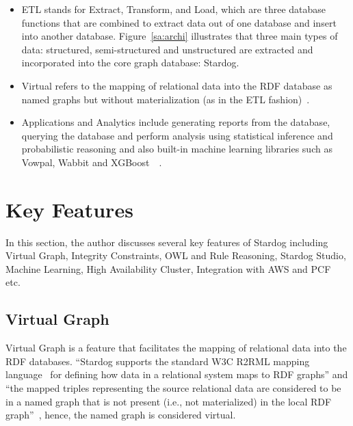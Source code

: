	\begin{itemize}
		
		\item ETL stands for Extract, Transform, and Load, which are three 
		database functions that are combined to extract data out of one 
		database and insert into another database. Figure~\ref{sa:archi} 
		illustrates that three main types of data: structured, semi-structured 
		and unstructured are extracted and incorporated into the core graph 
		database: Stardog. 
		
		\item Virtual refers to the mapping of relational data into the RDF 
		database as named graphs but without materialization (as in the ETL 
		fashion)~\cite{hid-sp18-405-blog-stardog-virtual}. 
		
		\item Applications and Analytics include generating reports from the 
		database, querying the database and perform analysis using statistical 
		inference and probabilistic reasoning and also built-in machine learning 
		libraries such as Vowpal, Wabbit and 
		XGBoost~\cite{hid-sp18-405-blog-stardog-ml}~\cite{hid-sp18-405-blog-stardog-xgboost}.
	
\end{itemize}

\section{Key Features}
\label{s:keyf}
	In this section, the author discusses several key features of Stardog 
	including Virtual Graph, Integrity Constraints, OWL and Rule 
	Reasoning, Stardog Studio, Machine Learning, High Availability Cluster, 
	Integration with AWS and PCF etc.\

	\subsection{Virtual Graph}
		Virtual Graph is a feature that facilitates the mapping of relational data 
		into the RDF databases. ``Stardog supports the standard W3C R2RML 
		mapping language~\cite{hid-sp18-405-www-stardog-r2rml} for defining 
		how data in a relational system maps to RDF graphs'' and ``the mapped 
		triples representing the source relational data are considered to be in a 
		named graph that is not present (i.e., not materialized) in the local RDF 
		graph''~\cite{hid-sp18-405-blog-stardog-virtual}, hence, the named 
		graph is considered virtual.
		
